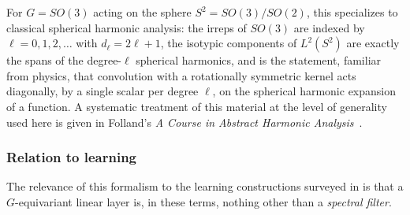 \documentclass[11pt]{article}
\theoremstyle{plain}
\theoremstyle{definition}
\begin{document}
For $G = SO(3)$ acting on the sphere $S^2 = SO(3)/SO(2)$, this specializes
to classical spherical harmonic analysis: the irreps of $SO(3)$ are indexed
by $\ell = 0,1,2,\dots$ with $d_\ell = 2\ell+1$, the isotypic components of
$L^2(S^2)$ are exactly the spans of the degree-$\ell$ spherical harmonics,
and  is the statement, familiar
from physics, that convolution with a rotationally symmetric kernel acts
diagonally, by a single scalar per degree $\ell$, on the spherical harmonic
expansion of a function. A systematic treatment of this material at the
level of generality used here is given in Folland's
\emph{A Course in Abstract Harmonic Analysis}~\citep{folland2016}.

\subsubsection{Relation to learning}
\label{subsubsec:harmonic-analysis-learning}

The relevance of this formalism to the learning constructions surveyed in
 is that a $G$-equivariant linear
layer is, in these terms, nothing other than a \emph{spectral filter}.
\end{document}
